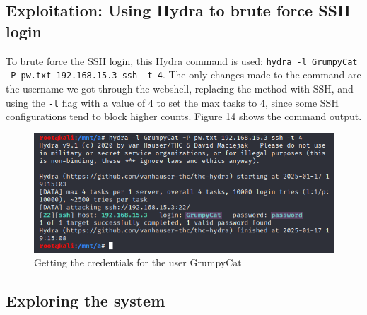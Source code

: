 \documentclass[a4paper]{article}
\newcommand{\abc}{\hfill \break}
\begin{document}
\subsection{Exploitation: Using Hydra to brute force SSH login}
To brute force the SSH login, this Hydra command is used: \abc\texttt{hydra -l GrumpyCat -P pw.txt 192.168.15.3 ssh -t 4}. The only changes made to the command are the username we got through the webshell, replacing the method with SSH, and using the \texttt{-t} flag with a value of 4 to set the max tasks to 4, since some SSH configurations tend to block higher counts. Figure 14 shows the command output. \cite{hydra-ssh}
\begin{figure}[h]
	\includegraphics[scale=0.5]{images/hydrassh.png}
	\centering
	\caption{Getting the credentials for the user GrumpyCat}
\end{figure}\abc
\newpage
\subsection{Exploring the system}
\end{document}
